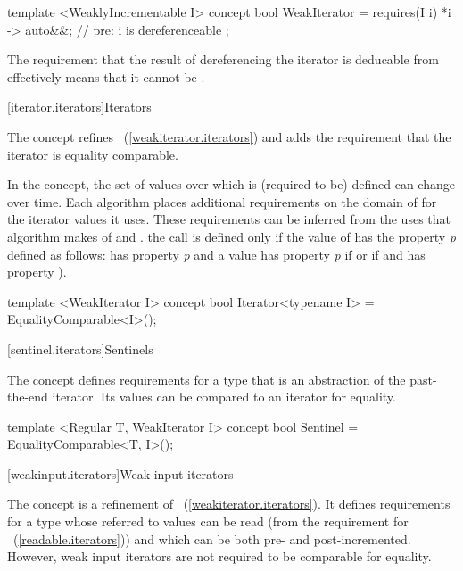 
\begin{addedblock}
\begin{codeblock}
template <WeaklyIncrementable I>
concept bool WeakIterator =
  requires(I i) {
    { *i } -> auto&&; // pre: i is dereferenceable
  };
\end{codeblock}

\enternote The requirement that the result of dereferencing the iterator is deducable from
 effectively means that it cannot be .\exitnote
\end{addedblock}

\begin{addedblock}
[iterator.iterators]{Iterators}

\pnum
The  concept refines ~(\ref{weakiterator.iterators}) and adds
the requirement that the iterator is equality comparable.

\pnum
In the  concept, the set of values over which
\tcode{==} is (required to be) defined can change over time.
Each algorithm places additional requirements on the domain of
\tcode{==} for the iterator values it uses.
These requirements can be inferred from the uses that algorithm
makes of \tcode{==} and \tcode{!=}.
\enterexample
the call 
is defined only if the value of 
has the property \textit{p}
defined as follows:
 has property \textit{p}
and a value 
has property \textit{p}
if
or if
and
has property
).
\exitexample

\begin{codeblock}
template <WeakIterator I>
concept bool Iterator<typename I> =
  EqualityComparable<I>();
\end{codeblock}

[sentinel.iterators]{Sentinels}

The  concept defines requirements for a type that
is an abstraction of the past-the-end iterator. Its values can be
compared to an iterator for equality.

\begin{codeblock}
template <Regular T, WeakIterator I>
concept bool Sentinel =
    EqualityComparable<T, I>();
\end{codeblock}

[weakinput.iterators]{Weak input iterators}

\pnum
The  concept is a refinement of
~(\ref{weakiterator.iterators}). It
defines requirements for a type whose referred to values can be read (from the requirement for
~(\ref{readable.iterators})) and which can be both pre- and post-incremented. However,
weak input iterators are not required to be comparable for equality.


\end{addedblock}
